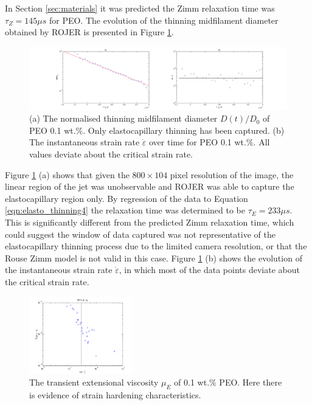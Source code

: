 \documentclass[11pt]{article}
\begin{document}
In Section \ref{sec:materials} it was predicted the Zimm relaxation time was 
$\tau_Z = 145 \mu s$ for PEO. The evolution of the thinning midfilament 
diameter obtained by ROJER is presented in Figure \ref{fig:PEO}.
\begin{figure}[H]
	\begin{center}
		\includegraphics[width = 1.15\textwidth, trim = 6cm 0cm 0cm 0cm]{img/PEO.png}
		\caption{(a) The normalised thinning midfilament diameter $D(t)/D_0$ of 
PEO 0.1 wt.\%. Only elastocapillary thinning has been captured. (b) The 
instantaneous strain rate $\dot{\varepsilon}$ over time for PEO 0.1 wt.\%. All 
values deviate about the critical strain rate.}
		\label{fig:PEO}
	\end{center}
\end{figure}

Figure \ref{fig:PEO} (a) shows that given the $800 \times 104$ pixel resolution 
of the image, the linear region of the jet was unobservable and ROJER was able 
to capture the elastocapillary region only. By regression of the data to 
Equation \ref{eqn:elasto_thinning4} the relaxation time was determined to be 
$\tau_E = 233 \mu s$. This is significantly different from the predicted Zimm 
relaxation time, which could suggest the window of data captured was not 
representative of the elastocapillary thinning process due to the limited 
camera resolution, or that the Rouse Zimm model is not valid in this case. 
Figure \ref{fig:PEO} (b) shows the evolution of the instantaneous strain rate 
$\dot{\varepsilon}$, in which most of the data points deviate about the 
critical strain rate. 
\begin{figure}[h]
	\begin{center}
		\includegraphics[width = 0.4\textwidth]{img/PEO_extensional.png}
		\caption{The transient extensional viscosity $\mu_E$ of 0.1 wt.\% PEO. 
Here there is evidence of strain hardening characteristics.}
		\label{fig:PEO_extensional}
	\end{center}
\end{figure}
\end{document}
